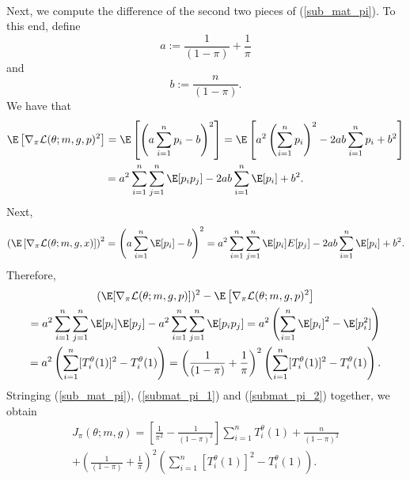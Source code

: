 \documentclass[12pt]{article}
\begin{document}
\begin{appendices}
\begin{multline}
\end{multline}
Next, we compute the difference of the second two pieces of (\ref{sub_mat_pi}). To this end, define $$a := \frac{1}{(1-\pi)} + \frac{1}{\pi}$$ and $$b := \frac{n}{(1-\pi)}.$$ We have that
\begin{multline*}
\E \left[ \nabla_\pi \mathcal{L}(\theta; m, g, p)^2 \right] = \E \left[ \left( a \sum_{i=1}^n p_i - b\right)^2 \right] =  \E \left[ a^2 \left( \sum_{i=1}^n p_i \right)^2 - 2ab \sum_{i=1}^n p_i + b^2 \right] \\ = a^2 \sum_{i=1}^n \sum_{j=1}^n \E[p_i p_j] -2ab \sum_{i=1}^n \E [p_i] + b^2.
\end{multline*}
Next,
\begin{multline*}
\left( \E \left[\nabla_\pi \mathcal{L}(\theta; m, g, x) \right] \right)^2 = \left( a \sum_{i=1}^n \E [p_i] - b \right)^2 = a^2 \sum_{i=1}^n \sum_{j=1}^n \E[p_i]  E[p_j] - 2ab \sum_{i=1}^n \E[p_i] + b^2.
\end{multline*}
Therefore,
\begin{multline}\label{submat_pi_2}
(\E [\nabla_\pi \mathcal{L}(\theta; m, g, p)])^2 - \E \left[\nabla_\pi \mathcal{L}(\theta; m, g, p)^2 \right] \\ = a^2 \sum_{i=1}^n \sum_{j=1}^n \E[p_i] \E[p_j] - a^2 \sum_{i=1}^n \sum_{j=1}^n \E[p_i p_j] = a^2 \left( \sum_{i=1}^n \E[p_i]^2 - \E[p_i^2]\right) \\ = a^2 \left( \sum_{i=1}^n [T^\theta_i(1)]^2 - T^\theta_i(1) \right) = \left( \frac{1}{(1 - \pi)} + \frac{1}{\pi} \right)^2 \left(\sum_{i=1}^n [T^\theta_i(1)]^2 - T^\theta_i(1) \right).
\end{multline}
Stringing (\ref{sub_mat_pi}), (\ref{submat_pi_1}) and (\ref{submat_pi_2}) together, we obtain
\begin{multline}\label{sub_mat_1_formula}
J_\pi(\theta; m, g) = 
\left[ \frac{1}{\pi^2} - \frac{1}{(1 - \pi )^2} \right] \sum_{i=1}^n T^\theta_i(1) + \frac{n}{(1-\pi )^2} \\ + \left( \frac{1}{(1 - \pi )} + \frac{1}{\pi} \right)^2 \left( \sum_{i=1}^n [T^\theta_i(1)]^2 - T^\theta_i(1) \right).
\end{multline}


\end{appendices}
\end{document}
